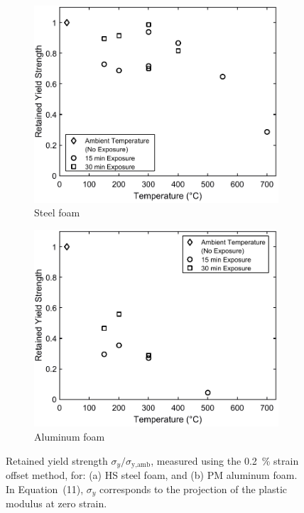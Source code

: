 \documentclass[review]{elsarticle}
\begin{document}
\begin{figure}
	\centering
	\begin{subfigure}{.5\textwidth}
		\centering
		\includegraphics[width=0.95\linewidth]
		{Tex-Figures/Fig13a-yield_stress.pdf}
		\caption{Steel foam}
		\label{fig3:sub1}
	\end{subfigure}%
	\begin{subfigure}{.5\textwidth}
		\centering
		\includegraphics[width=0.95\linewidth]
		{Tex-Figures/Fig13b-yield_stress.pdf}
		\caption{Aluminum foam}
		\label{fig3:sub2}
	\end{subfigure}
	\caption{Retained yield strength $\sigma_y/\sigma_\text{y,amb}$, measured using the 0.2~\% strain offset method, for: (a) HS steel foam, and (b) PM aluminum foam. In Equation~(11), $\sigma_y$ corresponds to the projection of the plastic modulus at zero strain.}
	\label{Quasi-elastic_modulus}
\end{figure}
\end{document}
